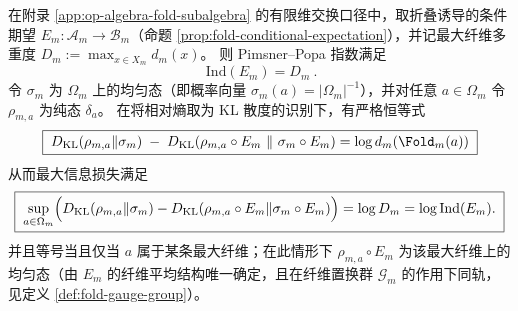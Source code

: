 \begin{proposition}\label{prop:op-algebra-index-extremal-entropy-loss-maxfiber}
在附录 \ref{app:op-algebra-fold-subalgebra} 的有限维交换口径中，取折叠诱导的条件期望 \(E_m:\mathcal{A}_m\to\mathcal{B}_m\)（命题 \ref{prop:fold-conditional-expectation}），并记最大纤维多重度 \(D_m:=\max_{x\in X_m}d_m(x)\)。
则 Pimsner--Popa 指数满足
\[
\boxed{\ \mathrm{Ind}(E_m)=D_m\ }.
\]
令 \(\sigma_m\) 为 \(\Omega_m\) 上的均匀态（即概率向量 \(\sigma_m(a)=|\Omega_m|^{-1}\)），并对任意 \(a\in\Omega_m\) 令 \(\rho_{m,a}\) 为纯态 \(\delta_a\)。
在将相对熵取为 KL 散度的识别下，有严格恒等式
\[
\boxed{\;
D_{\mathrm{KL}}(\rho_{m,a}\|\sigma_m)\;-\;D_{\mathrm{KL}}(\rho_{m,a}\circ E_m\ \|\ \sigma_m\circ E_m)
=\log d_m(\Fold_m(a))\;}
\]
从而最大信息损失满足
\[
\boxed{\;
\sup_{a\in\Omega_m}\Bigl(D_{\mathrm{KL}}(\rho_{m,a}\|\sigma_m)-D_{\mathrm{KL}}(\rho_{m,a}\circ E_m\|\sigma_m\circ E_m)\Bigr)
=\log D_m=\log\mathrm{Ind}(E_m).\;}
\]
并且等号当且仅当 \(a\) 属于某条最大纤维；在此情形下 \(\rho_{m,a}\circ E_m\) 为该最大纤维上的均匀态（由 \(E_m\) 的纤维平均结构唯一确定，且在纤维置换群 \(\mathcal{G}_m\) 的作用下同轨，见定义 \ref{def:fold-gauge-group}）。
\end{proposition}
